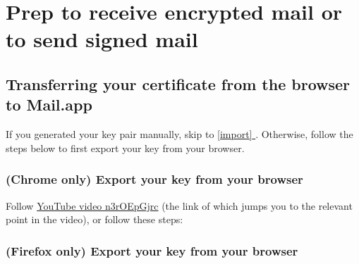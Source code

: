\documentclass[pdftex,12pt,titlepage=false]{scrartcl}
\newcommand*{\fullref}[1]{\hyperref[{#1}]{\autoref*{#1} \nameref*{#1}}}
\begin{document}
\section{Prep to receive encrypted mail or to send signed mail}




\subsection{Transferring your certificate from the browser to Mail.app}\label{cert_install}
If you generated your key pair manually, skip to \fullref{import}.
Otherwise, follow the steps below to first export your key from your
browser.
\subsubsection{(Chrome only) Export your key from your browser}
Follow \href{https://www.youtube.com/watch?v=n3rOEpGjrc\&start=310}{%
  YouTube video n3rOEpGjrc} (the link of which jumps you to the
relevant point in the video), or follow these steps:

\newcommand{\pwadvice}{%
  You will be prompted for a password for the backup file.  A strong
  password is important because the next step will expose the file to
  entities who could attack it.  Since this password is temporary
  (will only need to be typed on one occasion), a strong password will
  not be a burden.}
  


\subsubsection{(Firefox only) Export your key from your browser}
\end{document}
